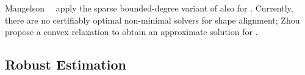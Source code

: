  Mangelson~\etal~\cite{Mangelson19icra-PGOwithSBSOS} apply the sparse bounded-degree variant of 
  also for \PGO. 
 Currently, there are no certifiably optimal non-minimal solvers for shape alignment; 
 Zhou~\etal~\cite{Zhou17pami-shapeEstimationConvex} propose a convex relaxation to obtain an approximate solution for \shape.

\subsection{Robust Estimation}
\label{sec:rw_robust}

